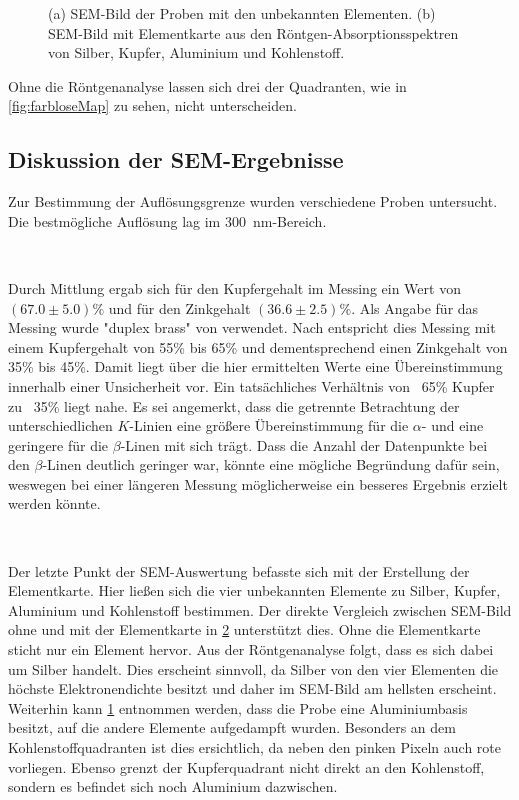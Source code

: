 \begin{figure}[H]
\begin{subfigure}[c]{.45\textwidth}
			\subcaption{}
			\label{fig:bunteMap}
		\end{subfigure}
		\caption{(a) SEM-Bild der Proben mit den unbekannten Elementen.
		(b) SEM-Bild mit Elementkarte aus den Röntgen-Absorptionsspektren von Silber, Kupfer, Aluminium und Kohlenstoff.}
		\label{fig:elementalMap}
	\end{figure}
	Ohne die Röntgenanalyse lassen sich drei der Quadranten, wie in \cref{fig:farbloseMap} zu sehen, nicht unterscheiden.

\subsection{Diskussion der SEM-Ergebnisse}

	Zur Bestimmung der Auflösungsgrenze wurden verschiedene Proben untersucht.
	Die bestmögliche Auflösung lag im \SI{300}{\nano\meter}-Bereich.

	\

	Durch Mittlung ergab sich für den Kupfergehalt im Messing ein Wert von $(67.0\pm5.0)\%$ und für den Zinkgehalt $(36.6\pm2.5)\%$.
	Als Angabe für das Messing wurde "duplex brass" von \cite{wwu} verwendet.
	Nach \cite{wikiMs} entspricht dies Messing mit einem Kupfergehalt von 55\% bis 65\% und dementsprechend einen Zinkgehalt von 35\% bis 45\%.
	Damit liegt über die hier ermittelten Werte eine Übereinstimmung innerhalb einer Unsicherheit vor.
	Ein tatsächliches Verhältnis von ~65\% Kupfer zu ~35\% liegt nahe.
	Es sei angemerkt, dass die getrennte Betrachtung der unterschiedlichen $K$-Linien eine größere Übereinstimmung für die $\alpha$- und eine geringere für die $\beta$-Linen mit sich trägt.
	Dass die Anzahl der Datenpunkte bei den $\beta$-Linen deutlich geringer war, könnte eine mögliche Begründung dafür sein, weswegen bei einer längeren Messung möglicherweise ein besseres Ergebnis erzielt werden könnte.

	\

	Der letzte Punkt der SEM-Auswertung befasste sich mit der Erstellung der Elementkarte.
	Hier ließen sich die vier unbekannten Elemente zu Silber, Kupfer, Aluminium und Kohlenstoff bestimmen.
	Der direkte Vergleich zwischen SEM-Bild ohne und mit der Elementkarte in \cref{fig:elementalMap} unterstützt dies.
	Ohne die Elementkarte sticht nur ein Element hervor.
	Aus der Röntgenanalyse folgt, dass es sich dabei um Silber handelt.
	Dies erscheint sinnvoll, da Silber von den vier Elementen die höchste Elektronendichte besitzt und daher im SEM-Bild am hellsten erscheint.
	Weiterhin kann \cref{fig:bunteMap} entnommen werden, dass die Probe eine Aluminiumbasis besitzt, auf die andere Elemente aufgedampft wurden.
	Besonders an dem Kohlenstoffquadranten ist dies ersichtlich, da neben den pinken Pixeln auch rote vorliegen.
	Ebenso grenzt der Kupferquadrant nicht direkt an den Kohlenstoff, sondern es befindet sich noch Aluminium dazwischen.

